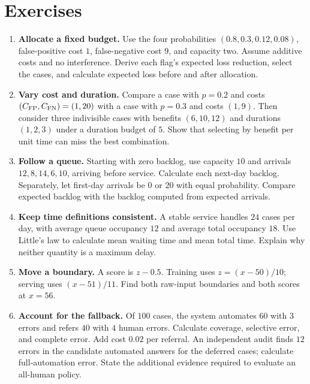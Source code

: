 \section{Exercises}

\begin{enumerate}
\item \textbf{Allocate a fixed budget.} Use the four probabilities $(0.8,0.3,0.12,0.08)$, false-positive cost $1$, false-negative cost $9$, and capacity two. Assume additive costs and no interference. Derive each flag's expected loss reduction, select the cases, and calculate expected loss before and after allocation.\par

\item \textbf{Vary cost and duration.} Compare a case with $p=0.2$ and costs $(C_{\rm FP},C_{\rm FN})=(1,20)$ with a case with $p=0.3$ and costs $(1,9)$. Then consider three indivisible cases with benefits $(6,10,12)$ and durations $(1,2,3)$ under a duration budget of $5$. Show that selecting by benefit per unit time can miss the best combination.\par

\item \textbf{Follow a queue.} Starting with zero backlog, use capacity $10$ and arrivals $12,8,14,6,10$, arriving before service. Calculate each next-day backlog. Separately, let first-day arrivals be $0$ or $20$ with equal probability. Compare expected backlog with the backlog computed from expected arrivals.\par

\item \textbf{Keep time definitions consistent.} A stable service handles $24$ cases per day, with average queue occupancy $12$ and average total occupancy $18$. Use Little's law to calculate mean waiting time and mean total time. Explain why neither quantity is a maximum delay.\par

\item \textbf{Move a boundary.} A score is $z-0.5$. Training uses $z=(x-50)/10$; serving uses $(x-51)/11$. Find both raw-input boundaries and both scores at $x=56$.\par

\item \textbf{Account for the fallback.} Of $100$ cases, the system automates $60$ with $3$ errors and refers $40$ with $4$ human errors. Calculate coverage, selective error, and complete error. Add cost $0.02$ per referral. An independent audit finds $12$ errors in the candidate automated answers for the deferred cases; calculate full-automation error. State the additional evidence required to evaluate an all-human policy.\par


\end{enumerate}
